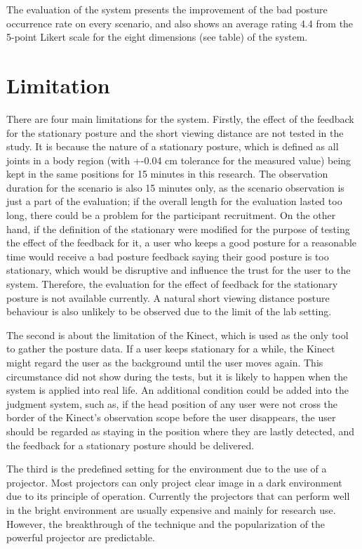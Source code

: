 The evaluation of the system presents the improvement of the bad posture occurrence rate on every scenario, and also shows an average rating 4.4 from the 5-point Likert scale for the eight dimensions (see table) of the system.

\section{Limitation}
There are four main limitations for the system. Firstly, the effect of the feedback for the stationary posture and the short viewing distance are not tested in the study. It is because the nature of a stationary posture, which is defined as all joints in a body region (with +-0.04 cm tolerance for the measured value) being kept in the same positions for 15 minutes in this research. The observation duration for the scenario is also 15 minutes only, as the scenario observation is just a part of the evaluation; if the overall length for the evaluation lasted too long, there could be a problem for the participant recruitment. On the other hand, if the definition of the stationary were modified for the purpose of testing the effect of the feedback for it, a user who keeps a good posture for a reasonable time would receive a bad posture feedback saying their good posture is too stationary, which would be disruptive and influence the trust for the user to the system. Therefore, the evaluation for the effect of feedback for the stationary posture is not available currently. A natural short viewing distance posture behaviour is also unlikely to be observed due to the limit of the lab setting.

The second is about the limitation of the Kinect, which is used as the only tool to gather the posture data. If a user keeps stationary for a while, the Kinect might regard the user as the background until the user moves again. This circumstance did not show during the tests, but it is likely to happen when the system is applied into real life. An additional condition could be added into the judgment system, such as, if the head position of any user were not cross the border of the Kinect’s observation scope before the user disappears, the user should be regarded as staying in the position where they are lastly detected, and the feedback for a stationary posture should be delivered.

The third is the predefined setting for the environment due to the use of a projector. Most projectors can only project clear image in a dark environment due to its principle of operation. Currently the projectors that can perform well in the bright environment are usually expensive and mainly for research use. However, the breakthrough of the technique and the popularization of the powerful projector are predictable.

